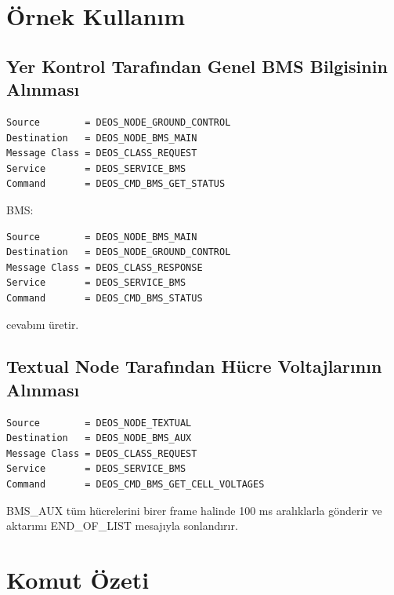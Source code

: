 \documentclass[a4paper,10pt]{article}
\begin{document}
\section{Örnek Kullanım}

\subsection{Yer Kontrol Tarafından Genel BMS Bilgisinin Alınması}

\begin{lstlisting}
Source        = DEOS_NODE_GROUND_CONTROL
Destination   = DEOS_NODE_BMS_MAIN
Message Class = DEOS_CLASS_REQUEST
Service       = DEOS_SERVICE_BMS
Command       = DEOS_CMD_BMS_GET_STATUS
\end{lstlisting}

BMS:

\begin{lstlisting}
Source        = DEOS_NODE_BMS_MAIN
Destination   = DEOS_NODE_GROUND_CONTROL
Message Class = DEOS_CLASS_RESPONSE
Service       = DEOS_SERVICE_BMS
Command       = DEOS_CMD_BMS_STATUS
\end{lstlisting}

cevabını üretir.

\subsection{Textual Node Tarafından Hücre Voltajlarının Alınması}

\begin{lstlisting}
Source        = DEOS_NODE_TEXTUAL
Destination   = DEOS_NODE_BMS_AUX
Message Class = DEOS_CLASS_REQUEST
Service       = DEOS_SERVICE_BMS
Command       = DEOS_CMD_BMS_GET_CELL_VOLTAGES
\end{lstlisting}

BMS\_AUX tüm hücrelerini birer frame halinde 100 ms aralıklarla
gönderir ve aktarımı END\_OF\_LIST mesajıyla sonlandırır.

\section{Komut Özeti}
\end{document}
